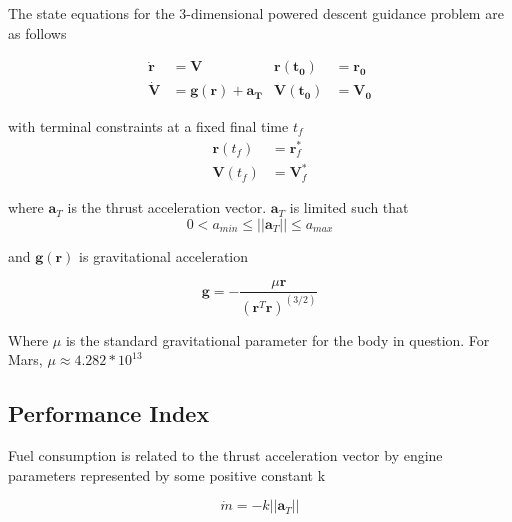 The state equations for the 3-dimensional powered descent guidance problem are as follows

\begin{align}
\label{eqn:EoM1}
\boldsymbol{\dot{r}} &= \boldsymbol{V}                               & \boldsymbol{r(t_0)} &= \boldsymbol{r_0}\\
\label{eqn:EoM2}
\boldsymbol{\dot{V}} &= \boldsymbol{g(r)} + \boldsymbol{a_T}                           & \boldsymbol{V(t_0)} &= \boldsymbol{V_0}
\end{align}


with terminal constraints at a fixed final time $t_f$
\begin{align}
\label{eqn:constraint_r}
\boldsymbol{r}(t_f) &= \boldsymbol{r}^*_f\\
\label{eqn:constraint_V}
\boldsymbol{V}(t_f) &= \boldsymbol{V}^*_f 
\end{align}

where $\boldsymbol{a}_T$ is the thrust acceleration vector. $\boldsymbol{a}_T$ is limited such that
\begin{equation} 
\label{eqn:thrustlimit}
0 < a_{min} \leq ||\boldsymbol{a}_T|| \leq a_{max}
\end{equation}

and $\bm{g}(\bm{r})$ is gravitational acceleration

\begin{equation}
\label{eqn:gravity}
\bm{g} = -\frac{\mu \bm{r}}{(\bm{r}^T\bm{r})^{(3/2)}}
\end{equation}

Where $\mu$ is the standard gravitational parameter for the body in question. For Mars, $\mu \approx 4.282*10^{13}$

\subsection{Performance Index}
Fuel consumption is related to the thrust acceleration vector by engine parameters represented by some positive constant k

\begin{equation}
\label{eqn:fuel_rate}
\dot{m} = -k ||\boldsymbol{a}_T||
\end{equation}

